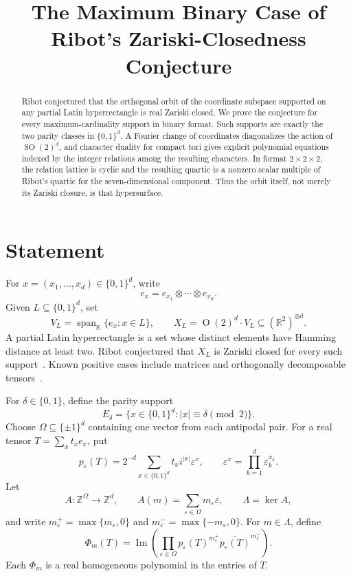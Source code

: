 \documentclass[11pt]{amsart}
\title[Maximum Binary Case of Ribot's Zariski-Closedness]{The Maximum Binary Case of Ribot's Zariski-Closedness Conjecture}
\date{}
\theoremstyle{remark}
\newcommand{\R}{\mathbb{R}}
\newcommand{\Z}{\mathbb{Z}}
\newcommand{\OO}{\operatorname{O}}
\newcommand{\SO}{\operatorname{SO}}
\newcommand{\Imag}{\operatorname{Im}}
\begin{document}
\begin{abstract}
Ribot conjectured that the orthogonal orbit of the coordinate subspace
supported on any partial Latin hyperrectangle is real Zariski closed. We
prove the conjecture for every maximum-cardinality support in binary format.
Such supports are exactly the two parity classes in $\{0,1\}^d$. A Fourier
change of coordinates diagonalizes the action of $\SO(2)^d$, and character
duality for compact tori gives explicit polynomial equations indexed by the
integer relations among the resulting characters. In format
$2\times2\times2$, the relation lattice is cyclic and the resulting quartic
is a nonzero scalar multiple of Ribot's quartic for the seven-dimensional
component. Thus the orbit itself, not merely its Zariski closure, is that
hypersurface.
\end{abstract}

\maketitle

\section{Statement}

For $x=(x_1,\ldots,x_d)\in\{0,1\}^d$, write
\[
e_x=e_{x_1}\otimes\cdots\otimes e_{x_d}.
\]
Given $L\subseteq\{0,1\}^d$, set
\[
V_L=\operatorname{span}_{\R}\{e_x:x\in L\},
\qquad
X_L=\OO(2)^d\cdot V_L\subseteq(\R^2)^{\otimes d}.
\]
A partial Latin hyperrectangle is a set whose distinct elements have Hamming
distance at least two. Ribot conjectured that $X_L$ is Zariski closed for
every such support~\cite[Conjecture~4.4]{Ribot}. Known positive cases include
matrices and orthogonally decomposable tensors~\cite{BDHR,Ribot}.

For $\delta\in\{0,1\}$, define the parity support
\[
E_\delta=\{x\in\{0,1\}^d:|x|\equiv\delta\pmod 2\}.
\]
Choose $\Omega\subseteq\{\pm1\}^d$ containing one vector from each antipodal
pair. For a real tensor $T=\sum_x t_xe_x$, put
\[
p_\varepsilon(T)
=2^{-d}\sum_{x\in\{0,1\}^d}t_x i^{|x|}\varepsilon^x,
\qquad
\varepsilon^x=\prod_{k=1}^d\varepsilon_k^{x_k}.
\]
Let
\[
A:\Z^\Omega\longrightarrow\Z^d,
\qquad
A(m)=\sum_{\varepsilon\in\Omega}m_\varepsilon\varepsilon,
\qquad
\Lambda=\ker A,
\]
and write $m_\varepsilon^+=\max\{m_\varepsilon,0\}$ and
$m_\varepsilon^-=\max\{-m_\varepsilon,0\}$. For $m\in\Lambda$, define
\[
\Phi_m(T)=
\Imag\!\left(
\prod_{\varepsilon\in\Omega}
p_\varepsilon(T)^{m_\varepsilon^+}
\overline{p_\varepsilon(T)}^{m_\varepsilon^-}
\right).
\]
Each $\Phi_m$ is a real homogeneous polynomial in the entries of $T$.
\end{document}
